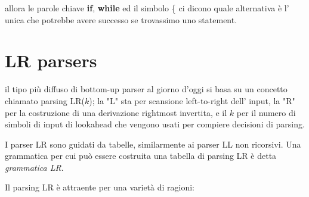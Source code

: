allora le parole chiave \textbf{if}, \textbf{while} ed il simbolo \{ ci dicono quale alternativa è l' unica che potrebbe avere successo se trovassimo uno statement.

\section{LR parsers}
il tipo più diffuso di bottom-up parser al giorno d'oggi si basa su un concetto chiamato parsing LR($k$); la "L" sta per scansione left-to-right dell' input, la "R" per la costruzione di una derivazione rightmost invertita, e il $k$ per il numero di simboli di input di lookahead che vengono usati per compiere decisioni di parsing. 

I parser LR sono guidati da tabelle, similarmente ai parser LL non ricorsivi. Una grammatica per cui può essere costruita una tabella di parsing LR è detta \textit{grammatica LR}. 

Il parsing LR è attraente per una varietà di ragioni:

